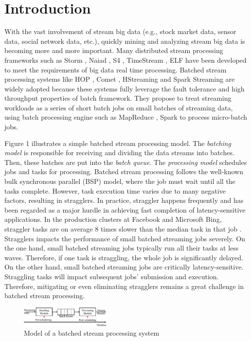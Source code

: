 
\section{Introduction}

  With the vast involvement of stream big data (e.g., stock market data, sensor data, social network data, etc.), quickly mining and analyzing stream big data is becoming more and more important. Many distributed stream processing frameworks such as Storm \cite{storm-web}, Naiad \cite{Murray2013}, S4 \cite{Neumeyer2010}, TimeStream \cite{Qian2013}, ELF \cite{Hu2014} have been developed to meet the requirements of big data real time processing. Batched stream processing systems like HOP \cite{Condie2010}, Comet \cite{He2010}, HStreaming \cite{HStreaming} and Spark Streaming \cite{Zaharia2013} are widely adopted because these systems fully leverage the fault tolerance and high throughput properties of batch framework\cite{spark-summit}. They propose to treat streaming workloads as a series of short batch jobs on small batches of streaming data, using batch processing engine such as MapReduce \cite{Dean2004}, Spark \cite{Zaharia2010C} to process micro-batch jobs.

  Figure 1 illustrates a simple batched stream processing model. The \emph{batching model} is responsible for receiving and dividing the data streams into batches. Then, these batches are put into the \emph{batch queue}. The \emph{processing model} schedules jobs and tasks for processing. Batched stream processing follows the well-known bulk synchronous parallel (BSP) model, where the job must wait until all the tasks complete. However, task execution time varies due to many negative factors, resulting in stragglers. In practice, straggler happens frequently and has been regarded as a major hurdle in achieving fast completion of latency-sensitive applications. In the production clusters at Facebook and Microsoft Bing, straggler tasks are on average 8 times slower than the median task in that job \cite{Ananthanarayanan2013} \cite{Yadwadkar2014}. Stragglers impacts the performance of small batched streaming jobs severely. On the one hand, small batched streaming jobs typically run all their tasks at less waves. Therefore, if one task is straggling, the whole job is significantly delayed. On the other hand, small batched streaming jobs are critically latency-sensitive. Straggling tasks will impact subsequent jobs' submission and execution. Therefore, mitigating or even eliminating stragglers remains a great challenge in batched stream processing.
  \begin{figure}[htbp]
    \centering
    \includegraphics[width=0.40\textwidth]{FigureModel}
    \caption{Model of a batched stream processing system}\label{Fig. 1:}
  \end{figure}

